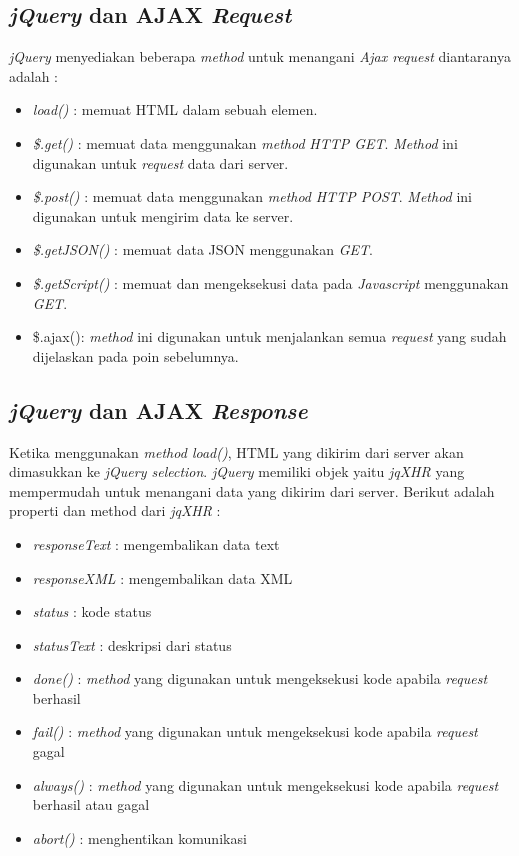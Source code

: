 \subsection{\textit{jQuery} dan AJAX \textit{Request}}
\textit{jQuery} menyediakan beberapa \textit{method} untuk menangani \textit{Ajax request} diantaranya adalah :

\begin{itemize}
	\item \textit{load()} : memuat HTML dalam sebuah elemen.
	\item \textit{\$.get()} : memuat data menggunakan \textit{method} \textit{HTTP GET}. \textit{Method} ini digunakan untuk \textit{request} data dari server.
	\item \textit{\$.post()} : memuat data menggunakan \textit{method} \textit{HTTP POST}. \textit{Method} ini digunakan untuk mengirim data ke server.
	\item \textit{\$.getJSON()} : memuat data JSON menggunakan \textit{GET}. 
	\item \textit{\$.getScript()} : memuat dan mengeksekusi data pada \textit{Javascript} menggunakan \textit{GET}.
	\item \$.ajax(): \textit{method} ini digunakan untuk menjalankan semua \textit{request} yang sudah dijelaskan pada poin sebelumnya. 
\end{itemize}

\subsection{\textit{jQuery} dan AJAX \textit{Response}}
Ketika menggunakan \textit{method load()}, HTML yang dikirim dari server akan dimasukkan ke \textit{jQuery selection}. \textit{jQuery} memiliki objek yaitu \textit{jqXHR} yang mempermudah untuk menangani data yang dikirim dari server. Berikut adalah properti dan method dari \textit{jqXHR} :

\begin{itemize}
	\item \textit{responseText} : mengembalikan data text
	\item \textit{responseXML} : mengembalikan data XML
	\item \textit{status} : kode status
	\item \textit{statusText} : deskripsi dari status
	\item \textit{done()} : \textit{method} yang digunakan untuk mengeksekusi kode apabila \textit{request} berhasil
	\item \textit{fail()} : \textit{method} yang digunakan untuk mengeksekusi kode apabila \textit{request} gagal
	\item \textit{always()} : \textit{method} yang digunakan untuk mengeksekusi kode apabila \textit{request} berhasil atau gagal
	\item \textit{abort()} : menghentikan komunikasi
\end{itemize} 

